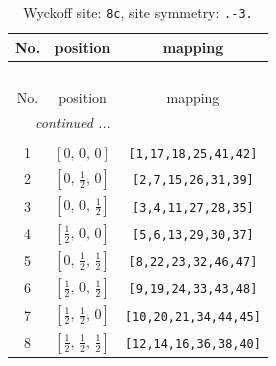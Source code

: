\documentclass[fleqn,8pt]{jsarticle}
\begin{document}
\renewcommand{\arraystretch}{1.2}
\begin{longtable}{ccc}
\caption{Wyckoff site: {\tt 8c}, site symmetry: {\tt .-3.}}
 \\
 \hline \hline
No. & position & mapping \\ \hline \endfirsthead

\multicolumn{2}{l}{\tablename\ \thetable{}} \\
 \hline \hline
No. & position & mapping \\ \hline \endhead

 \hline \hline
\multicolumn{2}{r}{\footnotesize\it continued ...} \\ \endfoot

 \hline \hline
\multicolumn{2}{r}{} \\ \endlastfoot

1 & $\left[ 0,\, 0,\, 0 \right]$ & {\tt [1,17,18,25,41,42]} \\ \hline
2 & $\left[ 0,\, \frac{1}{2},\, 0 \right]$ & {\tt [2,7,15,26,31,39]} \\ \hline
3 & $\left[ 0,\, 0,\, \frac{1}{2} \right]$ & {\tt [3,4,11,27,28,35]} \\ \hline
4 & $\left[ \frac{1}{2},\, 0,\, 0 \right]$ & {\tt [5,6,13,29,30,37]} \\ \hline
5 & $\left[ 0,\, \frac{1}{2},\, \frac{1}{2} \right]$ & {\tt [8,22,23,32,46,47]} \\ \hline
6 & $\left[ \frac{1}{2},\, 0,\, \frac{1}{2} \right]$ & {\tt [9,19,24,33,43,48]} \\ \hline
7 & $\left[ \frac{1}{2},\, \frac{1}{2},\, 0 \right]$ & {\tt [10,20,21,34,44,45]} \\ \hline
8 & $\left[ \frac{1}{2},\, \frac{1}{2},\, \frac{1}{2} \right]$ & {\tt [12,14,16,36,38,40]} \\
\end{longtable}
\renewcommand{\arraystretch}{1.2}
\end{document}
